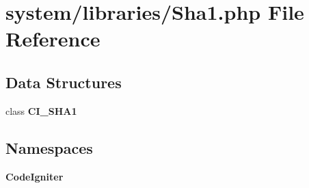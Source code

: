 \section{system/libraries/\-Sha1.php File Reference}
\label{_sha1_8php}
\subsection*{Data Structures}
\begin{DoxyCompactItemize}
\item 
class {\bf C\-I\-\_\-\-S\-H\-A1}
\end{DoxyCompactItemize}
\subsection*{Namespaces}
\begin{DoxyCompactItemize}
\item 
{\bf Code\-Igniter}
\end{DoxyCompactItemize}
